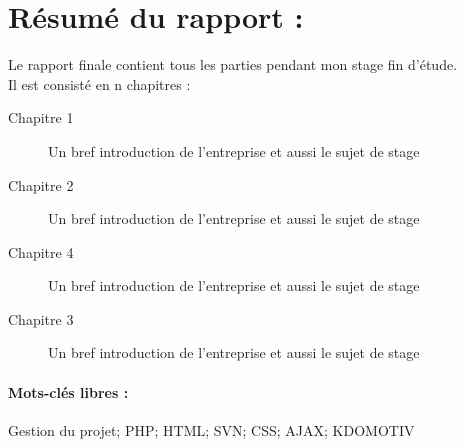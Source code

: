 \chapter*{Résumé du rapport :}
\flushleft
Le rapport finale  contient tous les parties pendant mon stage fin d'étude.\\
Il est consisté en n chapitres :
\begin{description}
  \item[Chapitre 1] Un bref introduction de l'entreprise et aussi le sujet de stage
  \item[Chapitre 2] Un bref introduction de l'entreprise et aussi le sujet de stage
  \item[Chapitre 4] Un bref introduction de l'entreprise et aussi le sujet de stage
  \item[Chapitre 3] Un bref introduction de l'entreprise et aussi le sujet de stage
\end{description}
\subsubsection*{Mots-clés libres :}
Gestion du projet; PHP; HTML; SVN; CSS; AJAX; KDOMOTIV

